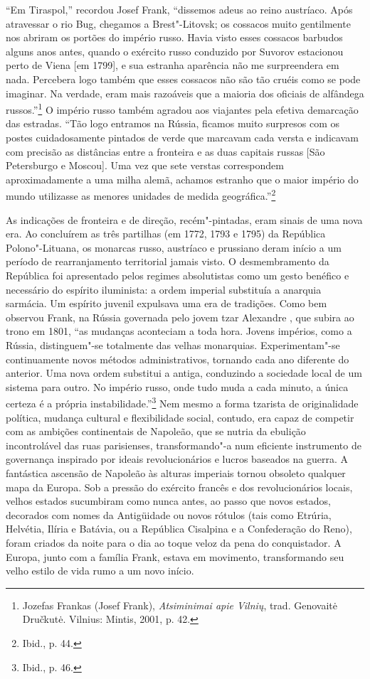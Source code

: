 ``Em Tiraspol,'' recordou Josef Frank, ``dissemos adeus ao reino
austríaco. Após atravessar o rio Bug, chegamos a Brest"-Litovsk; os
cossacos muito gentilmente nos abriram os portões do império russo.
Havia visto esses cossacos barbudos alguns anos antes, quando o exército
russo conduzido por Suvorov estacionou perto de Viena {[}em 1799{]}, e
sua estranha aparência não me surpreendera em nada. Percebera logo
também que esses cossacos não são tão cruéis como se pode imaginar. Na
verdade, eram mais razoáveis que a maioria dos oficiais de alfândega
russos.''\footnote{Jozefas Frankas (Josef Frank), \emph{Atsiminimai apie
  Vilnių}, trad. Genovaitė Dručkutė. Vilnius: Mintis, 2001, p. 42.} O
império russo também agradou aos viajantes pela efetiva demarcação das
estradas. ``Tão logo entramos na Rússia, ficamos muito surpresos com os
postes cuidadosamente pintados de verde que marcavam cada versta e
indicavam com precisão as distâncias entre a fronteira e as duas
capitais russas {[}São Petersburgo e Moscou{]}. Uma vez que sete verstas
correspondem aproximadamente a uma milha alemã, achamos estranho que o
maior império do mundo utilizasse as menores unidades de medida
geográfica.''\footnote{Ibid., p. 44.}

As indicações de fronteira e de direção, recém"-pintadas, eram sinais de
uma nova era. Ao concluírem as três partilhas (em 1772, 1793 e 1795) da
República Polono"-Lituana, os monarcas russo, austríaco e prussiano deram
início a um período de rearranjamento territorial jamais visto. O
desmembramento da República foi apresentado pelos regimes absolutistas
como um gesto benéfico e necessário do espírito iluminista: a ordem
imperial substituía a anarquia sarmácia. Um espírito juvenil expulsava
uma era de tradições. Como bem observou Frank, na Rússia governada pelo
jovem tzar Alexandre , que subira ao trono em 1801, ``as mudanças
aconteciam a toda hora. Jovens impérios, como a Rússia, distinguem"-se
totalmente das velhas monarquias. Experimentam"-se continuamente novos
métodos administrativos, tornando cada ano diferente do anterior. Uma
nova ordem substitui a antiga, conduzindo a sociedade local de um
sistema para outro. No império russo, onde tudo muda a cada minuto, a
única certeza é a própria instabilidade.''\footnote{Ibid., p. 46.} Nem
mesmo a forma tzarista de originalidade política, mudança cultural e
flexibilidade social, contudo, era capaz de competir com as ambições
continentais de Napoleão, que se nutria da ebulição incontrolável das
ruas parisienses, transformando"-a num eficiente instrumento de
governança inspirado por ideais revolucionários e lucros baseados na
guerra. A fantástica ascensão de Napoleão às alturas imperiais tornou
obsoleto qualquer mapa da Europa. Sob a pressão do exército francês e
dos revolucionários locais, velhos estados sucumbiram como nunca antes,
ao passo que novos estados, decorados com nomes da Antigüidade ou novos
rótulos (tais como Etrúria, Helvétia, Ilíria e Batávia, ou a República
Cisalpina e a Confederação do Reno), foram criados da noite para o dia
ao toque veloz da pena do conquistador. A Europa, junto com a família
Frank, estava em movimento, transformando seu velho estilo de vida rumo
a um novo início.

